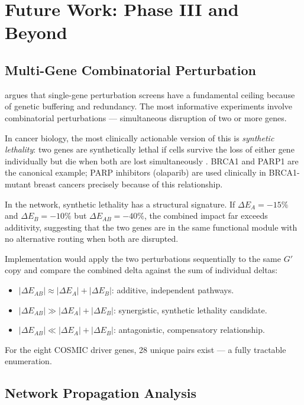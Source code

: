 \documentclass[12pt,a4paper]{report}
\begin{document}
\chapter{Future Work: Phase III and Beyond}

\section{Multi-Gene Combinatorial Perturbation}

\citet{markowetz2010understand} argues that single-gene perturbation screens have a fundamental ceiling because of genetic buffering and redundancy. The most informative experiments involve combinatorial perturbations — simultaneous disruption of two or more genes.

In cancer biology, the most clinically actionable version of this is \textit{synthetic lethality}: two genes are synthetically lethal if cells survive the loss of either gene individually but die when both are lost simultaneously \citep{barabasi2011network}. BRCA1 and PARP1 are the canonical example; PARP inhibitors (olaparib) are used clinically in BRCA1-mutant breast cancers precisely because of this relationship.

In the network, synthetic lethality has a structural signature. If $\Delta E_A = -15\%$ and $\Delta E_B = -10\%$ but $\Delta E_{AB} = -40\%$, the combined impact far exceeds additivity, suggesting that the two genes are in the same functional module with no alternative routing when both are disrupted.

Implementation would apply the two perturbations sequentially to the same $G'$ copy and compare the combined delta against the sum of individual deltas:
\begin{itemize}
  \item $|\Delta E_{AB}| \approx |\Delta E_A| + |\Delta E_B|$: additive, independent pathways.
  \item $|\Delta E_{AB}| \gg |\Delta E_A| + |\Delta E_B|$: synergistic, synthetic lethality candidate.
  \item $|\Delta E_{AB}| \ll |\Delta E_A| + |\Delta E_B|$: antagonistic, compensatory relationship.
\end{itemize}

For the eight COSMIC driver genes, 28 unique pairs exist — a fully tractable enumeration.

\section{Network Propagation Analysis}
\end{document}
